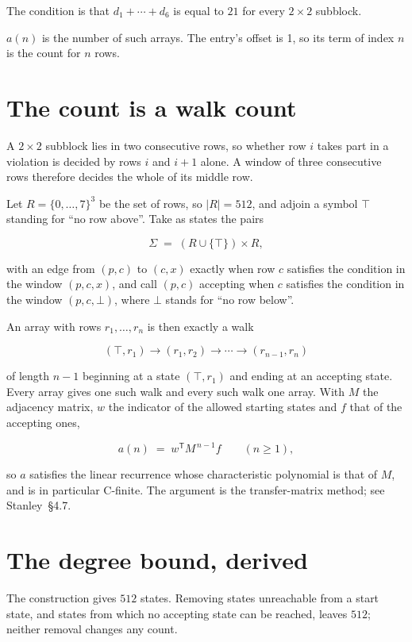 \documentclass[11pt]{article}
\theoremstyle{definition}
\begin{document}
The condition is that $d_1+\cdots+d_6$ is equal to $21$ for every $2\times2$ subblock.

$a(n)$ is the number of such arrays. The entry's offset is 1, so its term of index $n$ is the count for $n$ rows.

\section{The count is a walk count}

A $2\times2$ subblock lies in two consecutive rows, so whether row $i$ takes part in a violation is decided by rows $i$ and $i+1$ alone. A window of three consecutive rows therefore decides the whole of its middle row.

Let $R = \{0,\dots,7\}^{3}$ be the set of rows, so $|R| = 512$, and adjoin a symbol $\top$ standing for ``no row above''. Take as states the pairs

\[\Sigma \;=\; (R \cup \{\top\}) \times R,\]

with an edge from $(p,c)$ to $(c,x)$ exactly when row $c$ satisfies the condition in the window $(p,c,x)$, and call $(p,c)$ accepting when $c$ satisfies the condition in the window $(p,c,\bot)$, where $\bot$ stands for ``no row below''.

An array with rows $r_1,\dots,r_n$ is then exactly a walk

\[(\top,r_1) \to (r_1,r_2) \to \cdots \to (r_{n-1},r_n)\]

of length $n-1$ beginning at a state $(\top,r_1)$ and ending at an accepting state. Every array gives one such walk and every such walk one array. With $M$ the adjacency matrix, $w$ the indicator of the allowed starting states and $f$ that of the accepting ones,

\[a(n) \;=\; w^{\mathsf T} M^{\,n-1} f \qquad (n \ge 1),\]

so $a$ satisfies the linear recurrence whose characteristic polynomial is that of $M$, and is in particular C-finite. The argument is the transfer-matrix method; see Stanley~\S4.7.

\section{The degree bound, derived}

The construction gives $512$ states. Removing states unreachable from a start state, and states from which no accepting state can be reached, leaves $512$; neither removal changes any count.
\end{document}
